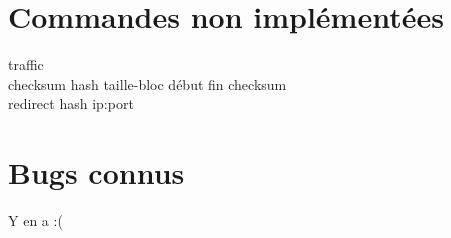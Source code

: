 \section{Commandes non implémentées}
\begin{description}
    \item[traffic]
    \item[checksum hash taille-bloc début fin checksum] 
    \item[redirect hash ip:port]

\end{description}
\section{Bugs connus}
Y en a :(
